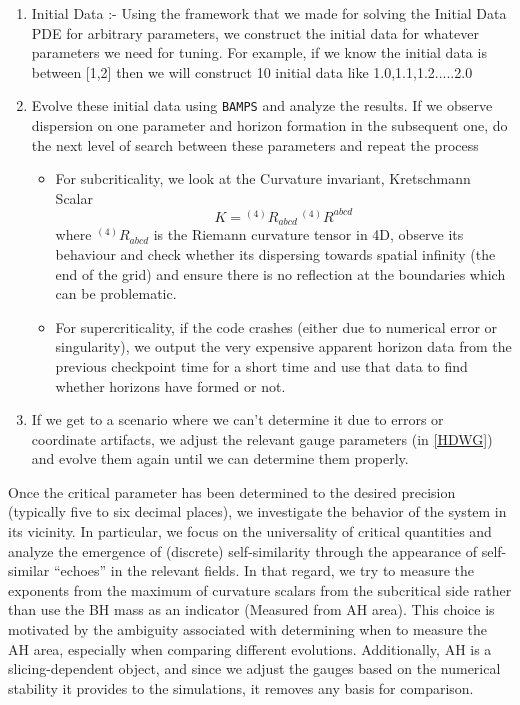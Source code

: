 \begin{enumerate}[nosep]
    \item Initial Data :- Using the framework that we made for solving the Initial Data PDE for arbitrary parameters, we construct the initial data for whatever parameters we need for tuning. For example, if we know the initial data is between [1,2] then we will construct 10 initial data like 1.0,1.1,1.2.....2.0 
    \item Evolve these initial data using \texttt{BAMPS} and analyze the results. If we observe dispersion on one parameter and horizon formation in the subsequent one, do the next level of search between these parameters and repeat the process
    \begin{itemize}[nosep]
    \item For subcriticality, we look at the Curvature invariant, Kretschmann Scalar $$K = {}^{(4)}R_{abcd}\,{}^{(4)}R^{abcd}$$ where ${}^{(4)}R_{abcd}$ is the Riemann curvature tensor in 4D, observe its behaviour and check whether its dispersing towards spatial infinity (the end of the grid) and ensure there is no reflection at the boundaries which can be problematic.

    \item For supercriticality, if the code crashes (either due to numerical error or singularity), we output the very expensive apparent horizon data from the previous checkpoint time for a short time and use that data to find whether horizons have formed or not. 
    \end{itemize}
    \item If we get to a scenario where we can't determine it due to errors or coordinate artifacts, we adjust the relevant gauge parameters (in \ref{HDWG}) and evolve them again until we can determine them properly.
\end{enumerate}
Once the critical parameter has been determined to the desired precision (typically five to six decimal places), we investigate the behavior of the system in its vicinity. In particular, we focus on the universality of critical quantities and analyze the emergence of (discrete) self-similarity through the appearance of self-similar ``echoes” in the relevant fields. In that regard, we try to measure the exponents from the maximum of curvature scalars from the subcritical side \cite{garfinkle_duncan_1998} rather than use the BH mass as an indicator (Measured from AH area). This choice is motivated by the ambiguity associated with determining when to measure the AH area, especially when comparing different evolutions. Additionally, AH is a slicing-dependent object, and since we adjust the gauges based on the numerical stability it provides to the simulations, it removes any basis for comparison.
